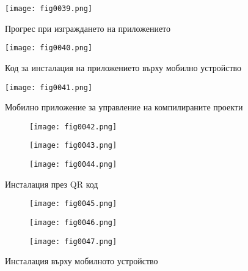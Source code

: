 \begin{figure}[H]
  \centering
  \texttt{[image: fig0039.png]}
  \caption{Прогрес при изграждането на приложението}
\label{fig0039}
\end{figure}

\begin{figure}[H]
  \centering
  \texttt{[image: fig0040.png]}
  \caption{Код за инсталация на приложението върху мобилно устройство}
\label{fig0040}
\end{figure}

\begin{figure}[H]
  \centering
  \texttt{[image: fig0041.png]}
  \caption{Мобилно приложение за управление на компилираните проекти}
\label{fig0041}
\end{figure}

\begin{figure}[H]
  \begin{subfigure}{0.31\textwidth}
  \texttt{[image: fig0042.png]}
  \label{fig0042}
  \end{subfigure}
  \begin{subfigure}{0.31\textwidth}
  \texttt{[image: fig0043.png]}
  \label{fig0043}
  \end{subfigure}
  \begin{subfigure}{0.31\textwidth}
  \texttt{[image: fig0044.png]}
  \label{fig0044}
  \end{subfigure}
  \caption{Инсталация през QR код}
\end{figure}

\begin{figure}[H]
  \begin{subfigure}{0.31\textwidth}
  \texttt{[image: fig0045.png]}
  \label{fig0045}
  \end{subfigure}
  \begin{subfigure}{0.31\textwidth}
  \texttt{[image: fig0046.png]}
  \label{fig0046}
  \end{subfigure}
  \begin{subfigure}{0.31\textwidth}
  \texttt{[image: fig0047.png]}
  \label{fig0047}
  \end{subfigure}
  \caption{Инсталация върху мобилното устройство}
\end{figure}

